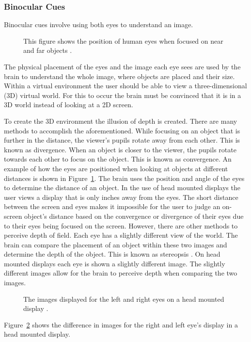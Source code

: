\subsubsection{Binocular Cues} \label{sec:Binocular Cues}
Binocular cues involve using both eyes to understand an image. 
\begin{figure}[!ht]
	\begin{center}
	\end{center}
	\caption{This figure shows the position of human eyes when focused on near and far objects \cite{JIS2}.} \label{fig:eyeconvergence}
\end{figure} The physical placement of the eyes and the image each eye sees are used by the brain to understand the whole image, where objects are placed and their size. Within a virtual environment the user should be able to view a three-dimensional (3D) virtual world. For this to occur the brain must be convinced that it is in a 3D world instead of looking at a 2D screen. 


To create the 3D environment the illusion of depth is created. There are many methods to accomplish the aforementioned. While focusing on an object that is further in the distance, the viewer's pupils rotate away from each other. This is known as divergence. When an object is closer to the viewer, the pupils rotate towards each other to focus on the object. This is known as convergence. An example of how the eyes are positioned when looking at objects at different distances is shown in Figure~\ref{fig:eyeconvergence}. The brain uses the position and angle of the eyes to determine the distance of an object. In the use of head mounted displays the user views a display that is only inches away from the eyes. The short distance between the screen and eyes makes it impossible for the user to judge an on-screen object's distance based on the convergence or divergence of their eyes due to their eyes being focused on the screen. However, there are other methods to perceive depth of field. Each eye has a slightly different view of the world. The brain can compare the placement of an object within these two images and determine the depth of the object. This is known as stereopsis \cite{JIS2}. On head mounted displays each eye is shown a slightly different image. The slightly different images allow for the brain to perceive depth when comparing the two images. 
\begin{figure}[!ht]
	\begin{center}
	\end{center}
	\caption{The images displayed for the left and right eyes on a head mounted display \cite{LaValle2017}.} \label{fig:LeftRightEye}
\end{figure} Figure~\ref{fig:LeftRightEye} shows the difference in images for the right and left eye's display in a head mounted display. 


